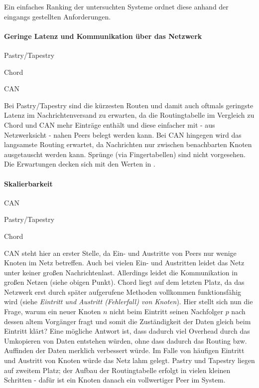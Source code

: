 Ein einfaches Ranking der untersuchten Systeme ordnet diese anhand der eingangs gestellten Anforderungen.

\paragraph{Geringe Latenz und Kommunikation über das Netzwerk}
\begin{enumerate*}
\item Pastry/Tapestry
\item Chord
\item CAN
\end{enumerate*}
Bei Pastry/Tapestry sind die kürzesten Routen und damit auch oftmals geringste Latenz im Nachrichtenversand zu erwarten, da die Routingtabelle im Vergleich zu Chord und CAN mehr Einträge enthält und diese einfacher mit - aus Netzwerksicht - nahen Peers belegt werden kann. Bei CAN hingegen wird das langsamste Routing erwartet, da Nachrichten nur zwischen benachbarten Knoten ausgetauscht werden kann. Sprünge (via Fingertabellen) sind nicht vorgesehen.\\
Die Erwartungen decken sich mit den Werten in .


\paragraph{Skalierbarkeit}
\begin{enumerate*}
\item CAN
\item Pastry/Tapestry
\item Chord
\end{enumerate*}
CAN steht hier an erster Stelle, da Ein- und Austritte von Peers nur wenige Knoten im Netz betreffen. Auch bei vielen Ein- und Austritten leidet das Netz unter keiner großen Nachrichtenlast. Allerdings leidet die Kommunikation in großen Netzen (siehe obigen Punkt). Chord liegt auf dem letzten Platz, da das Netzwerk erst durch später aufgerufene Methoden vollkommen funktionsfähig wird (siehe \emph{Eintritt und Austritt (Fehlerfall) von Knoten}). Hier stellt sich nun die Frage, warum ein neuer Knoten $n$ nicht beim Eintritt seinen Nachfolger $p$ nach dessen altem Vorgänger fragt und somit die Zuständigkeit der Daten gleich beim Eintritt klärt? Eine mögliche Antwort ist, dass dadurch viel Overhead durch das Umkopieren von Daten entstehen würden, ohne dass dadurch das Routing bzw. Auffinden der Daten merklich verbessert würde. Im Falle von häufigen Eintritt und Austritt von Knoten würde das Netz lahm gelegt. Pastry und Tapestry liegen auf zweitem Platz; der Aufbau der Routingtabelle erfolgt in vielen kleinen Schritten - dafür ist ein Knoten danach ein vollwertiger Peer im System.

